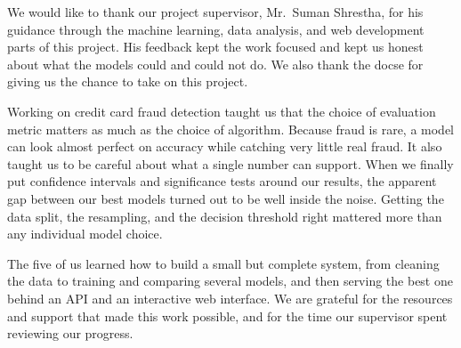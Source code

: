 We would like to thank our project supervisor, Mr.\ Suman Shrestha, for his guidance
through the machine learning, data analysis, and web development parts of this project.
His feedback kept the work focused and kept us honest about what the models could and
could not do. We also thank the \gls{docse} for giving us the chance to take on this
project.

Working on credit card fraud detection taught us that the choice of evaluation metric
matters as much as the choice of algorithm. Because fraud is rare, a model can look almost
perfect on accuracy while catching very little real fraud. It also taught us to be careful
about what a single number can support. When we finally put confidence intervals and
significance tests around our results, the apparent gap between our best models turned out
to be well inside the noise. Getting the data split, the resampling, and the decision
threshold right mattered more than any individual model choice.

The five of us learned how to build a small but complete system, from cleaning the data to
training and comparing several models, and then serving the best one behind an API and an
interactive web interface. We are grateful for the resources and support that made this
work possible, and for the time our supervisor spent reviewing our progress.
